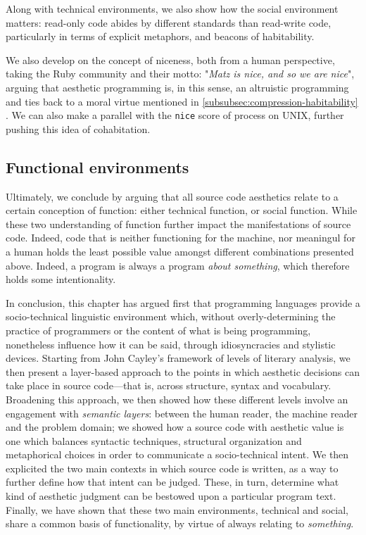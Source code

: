 Along with technical environments, we also show how the social environment matters: read-only code abides by different standards than read-write code, particularly in terms of explicit metaphors, and beacons of habitability.

We also develop on the concept of niceness, both from a human perspective, taking the Ruby community and their motto: "\emph{Matz is nice, and so we are nice}", arguing that aesthetic programming is, in this sense, an altruistic programming and ties back to a moral virtue mentioned in \ref{subsubsec:compression-habitability} \citep{fleetwood-boldt_matz_2020}. We can also make a parallel with the \lstinline{nice} score of process on UNIX, further pushing this idea of cohabitation.

\subsection{Functional environments}
\label{subsec:functional-environments}

Ultimately, we conclude by arguing that all source code aesthetics relate to a certain conception of function: either technical function, or social function. While these two understanding of function further impact the manifestations of source code. Indeed, code that is neither functioning for the machine, nor meaningul for a human holds the least possible value amongst different combinations presented above. Indeed, a program is always a program \emph{about something}, which therefore holds some intentionality.

\spacer

In conclusion, this chapter has argued first that programming languages provide a socio-technical linguistic environment which, without overly-determining the practice of programmers or the content of what is being programming, nonetheless influence how it can be said, through idiosyncracies and stylistic devices. Starting from John Cayley's framework of levels of literary analysis, we then present a layer-based approach to the points in which aesthetic decisions can take place in source code—that is, across structure, syntax and vocabulary. Broadening this approach, we then showed how these different levels involve an engagement with \emph{semantic layers}: between the human reader, the machine reader and the problem domain; we showed how a source code with aesthetic value is one which balances syntactic techniques, structural organization and metaphorical choices in order to communicate a socio-technical intent. We then explicited the two main contexts in which source code is written, as a way to further define how that intent can be judged. These, in turn, determine what kind of aesthetic judgment can be bestowed upon a particular program text. Finally, we have shown that these two main environments, technical and social, share a common basis of functionality, by virtue of always relating to \emph{something}.